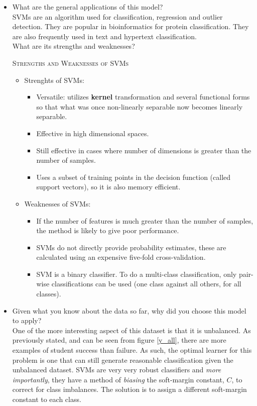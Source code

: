 \documentclass[twoside,openright,titlepage,numbers=noenddot,headinclude,%
               footinclude=true,cleardoublepage=empty,abstractoff,BCOR=5mm,%
               paper=a4,fontsize=11pt,ngerman,american]{scrreprt}
\numberwithin{theorem}{chapter}
\numberwithin{definition}{chapter}
\numberwithin{algorithm}{chapter}
\numberwithin{figure}{chapter}
\numberwithin{table}{chapter}
\numberwithin{equation}{chapter}
\newenvironment{remark}[1]{%
  \definecolor{shadecolor}{gray}{0.9}%
  \begin{shaded}{\color{Maroon}\noindent\textsc{#1}}\\%
}{%
  \end{shaded}%
}
\begin{document}
\begin{itemize}
\item What are the general applications of this model?\\ 
SVMs are an algorithm used for classification, regression and outlier detection. They are popular in bioinformatics for protein classification. They are also frequently used in text and hypertext classification. \\
What are its strengths and weaknesses?
\begin{remark}{Strengths and Weaknesses of SVMs}
\begin{itemize}
       \item Strenghts of SVMs:
              \begin{itemize} 
                     \item Versatile: utilizes \textbf{kernel} transformation and several functional forms so that what was once non-linearly separable now becomes linearly separable.
                     \item Effective in high dimensional spaces.
                     \item Still effective in cases where number of dimensions is greater than the number of samples.
                     \item Uses a subset of training points in the decision function (called support vectors), so it is also memory efficient.
              \end{itemize}
       \item Weaknesses of SVMs:
              \begin{itemize} 
                     \item If the number of features is much greater than the number of samples, the method is likely to give poor performance.
                     \item SVMs do not directly provide probability estimates, these are calculated using an expensive five-fold cross-validation.
                     \item SVM is a binary classifier. To do a multi-class classification, only pair-wise classifications can be used (one class against all others, for all classes).
              \end{itemize}
       \end{itemize}
\end{remark}

\item Given what you know about the data so far, why did you choose this model to apply?\\
One of the more interesting aspect of this dataset is that it is unbalanced. As previously stated, and can be seen from figure \ref{y_all}, there are more examples of student success than failure. As such, the optimal learner for this problem is one that can still generate reasonable classification given the unbalanced dataset. SVMs are very very robust classifiers and \textit{more importantly}, they have a method of \textit{biasing} the soft-margin constant, $C$, to correct for class imbalances. The solution is to assign a different soft-margin constant to each class.

\end{itemize}
\end{document}
